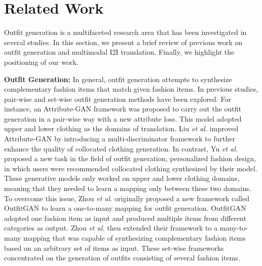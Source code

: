 \section{Related Work}
\label{sec:bg}
	
	Outfit generation is a multifaceted research area that has been investigated in several studies. In this section, we present a brief review of previous work on outfit generation and multimodal I2I translation. Finally, we highlight the positioning of our work. 
	
	\textbf{Outfit Generation:} In general, outfit generation attempts to synthesize complementary fashion items that match given fashion items. In previous studies, pair-wise \cite{liu2019toward,liu2019collocating,yu2019personalized} and set-wise \cite{zhou2022learning,zhou2022coutfitgan} outfit generation methods have been explored. For instance, an Attribute-GAN \cite{liu2019toward} framework was proposed to carry out the outfit generation in a pair-wise way with a new attribute loss. This model adopted upper and lower clothing as the domains of translation. Liu \textit{et al.} \cite{liu2019collocating} improved Attribute-GAN by introducing a multi-discriminator framework to further enhance the quality of collocated clothing generation. In contrast, Yu \textit{et al.} \cite{yu2019personalized} proposed a new task in the field of outfit generation, personalized fashion design, in which users were recommended collocated clothing synthesized by their model. These generative models only worked on upper and lower clothing domains, meaning that they needed to learn a mapping only between these two domains. To overcome this issue, Zhou \textit{et al.} \cite{zhou2022learning} originally proposed a new framework called OutfitGAN to learn a one-to-many mapping for outfit generation. OutfitGAN adopted one fashion item as input and produced multiple items from different categories as output. Zhou \textit{et al.} \cite{zhou2022coutfitgan} then extended their framework to a many-to-many mapping that was capable of synthesizing complementary fashion items based on an arbitrary set of items as input. These set-wise frameworks concentrated on the generation of outfits consisting of several fashion items.
	
